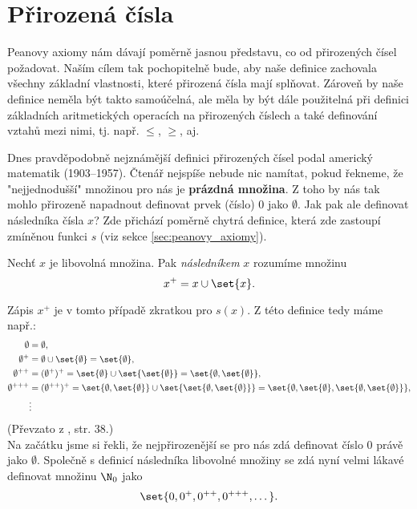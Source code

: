 \section{Přirozená čísla}\label{sec:prirozena_cisla}
Peanovy axiomy nám dávají poměrně jasnou představu, co od přirozených čísel požadovat. Naším cílem tak pochopitelně bude, aby naše definice zachovala všechny základní vlastnosti, které přirozená čísla mají splňovat. Zároveň by naše definice neměla být takto samoúčelná, ale měla by být dále použitelná při definici základních aritmetických operacích na přirozených číslech a také definování vztahů mezi nimi, tj. např. $\leq$, $\geq$, aj.\par
Dnes pravděpodobně nejznámější definici přirozených čísel podal americký matematik  (1903--1957). Čtenář nejspíše nebude nic namítat, pokud řekneme, že "nejjednodušší" množinou pro nás je \textbf{prázdná množina}. Z toho by nás tak mohlo přirozeně napadnout definovat prvek (číslo) 0 jako $\emptyset$. Jak pak ale definovat následníka čísla $x$? Zde přichází poměrně chytrá definice, která zde zastoupí zmíněnou funkci $s$ (viz sekce \ref{sec:peanovy_axiomy}).
\begin{definition}[Následník]\label{def:naslednik}
    Nechť $x$ je libovolná množina. Pak \emph{následníkem} $x$ rozumíme množinu
    \begin{equation*}
        x^+=x\cup\set{x}.
    \end{equation*}
\end{definition}
Zápis $x^+$ je v tomto případě zkratkou pro $s(x)$. Z této definice tedy máme např.:
\begin{align*}
    \emptyset&=\emptyset,\\
    \emptyset^+&=\emptyset\cup\set{\emptyset}=\set{\emptyset},\\
    \emptyset^{++}&=(\emptyset^+)^+=\set{\emptyset}\cup\set{\set{\emptyset}}=\set{\emptyset,\set{\emptyset}},\\
    \emptyset^{+++}&=(\emptyset^{++})^+=\set{\emptyset,\set{\emptyset}}\cup\set{\set{\emptyset,\set{\emptyset}}}=\set{\emptyset,\set{\emptyset},\set{\emptyset,\set{\emptyset}}},\\
    &\vdots
\end{align*}
(Převzato z \cite{Goldrei2017}, str. 38.)\\
Na začátku jsme si řekli, že nejpřirozenější se pro nás zdá definovat číslo 0 právě jako $\emptyset$. Společně s definicí následníka libovolné množiny se zdá nyní velmi lákavé definovat množinu $\N_0$ jako
\begin{equation*}
    \set{0,0^+,0^{++},0^{+++},\dots}.
\end{equation*}

